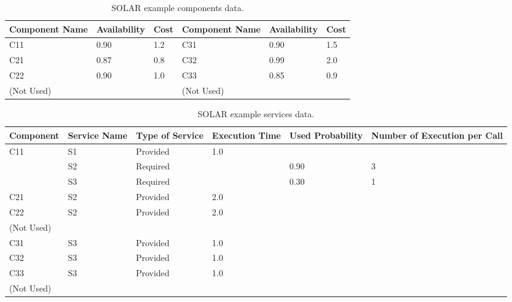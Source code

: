 \begin{table}[ht!b]
	\centering
	\begin{tabular}{|p{2cm}|p{2cm}|p{1cm}||p{2cm}|p{2cm}|p{1cm}|}
		\hline 
		\textbf{Component Name} & \textbf{Availability} & \textbf{Cost} & \textbf{Component Name} & \textbf{Availability} & \textbf{Cost} \\ 
		\hline 
		C11 & 0.90 & 1.2 & C31 & 0.90 & 1.5 \\
		\hline 
		C21 & 0.87 & 0.8 & C32 & 0.99 & 2.0 \\ 
		\hline 
		C22 & \multirow{2}{*}{0.90} & \multirow{2}{*}{1.0} & C33 & \multirow{2}{*}{0.85} & \multirow{2}{*}{0.9} \\ 
		(Not Used) & & & (Not Used) & & \\
		\hline 
	\end{tabular} 
	\caption[SOLAR Components data]{SOLAR example components data.}
	\label{tab:solar-comp-specs}
\end{table}

\begin{table}[ht!b]
	\centering
	\begin{tabular}{|p{2cm}|p{2.5cm}|p{1.4cm}|p{1.7cm}|p{1.5cm}|p{1.8cm}|}
		\hline 
		\textbf{Component} & \textbf{Service Name} & \textbf{Type of Service} & \textbf{Execution Time} & \textbf{Used Probability} & \textbf{Number of Execution per Call} \\ 
		\hline 
		\multirow{3}{*}{C11} & S1 & Provided & 1.0 & & \\\cline{2-6}
		& S2 & Required & & 0.90 & 3 \\
		& S3 & Required & & 0.30 & 1 \\
		\hline 
		C21 & S2 & Provided & 2.0 & & \\
		\hline 
		C22 & \multirow{2}{*}{S2} & \multirow{2}{*}{Provided} & \multirow{2}{*}{2.0} & & \\
		(Not Used) & & & & & \\
		\hline 
		C31 & S3 & Provided & 1.0 & & \\
		\hline
		C32 & S3 & Provided & 1.0 & & \\
		\hline
		C33 & \multirow{2}{*}{S3} & \multirow{2}{*}{Provided} &\multirow{2}{*}{1.0} & & \\
		(Not Used) & & & & & \\
		\hline
	\end{tabular} 
	\caption[SOLAR Services data]{SOLAR example services data.}
	\label{tab:solar-serv-specs}
\end{table}


